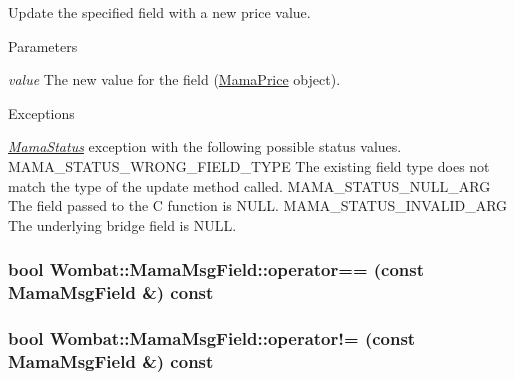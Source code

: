 Update the specified field with a new price value. 
\begin{DoxyParams}{Parameters}
\item[{\em value}]The new value for the field (\hyperlink{classWombat_1_1MamaPrice}{MamaPrice} object).\end{DoxyParams}

\begin{DoxyExceptions}{Exceptions}
\item[{\em \hyperlink{classWombat_1_1MamaStatus}{MamaStatus}}]exception with the following possible status values. MAMA\_\-STATUS\_\-WRONG\_\-FIELD\_\-TYPE The existing field type does not match the type of the update method called. MAMA\_\-STATUS\_\-NULL\_\-ARG The field passed to the C function is NULL. MAMA\_\-STATUS\_\-INVALID\_\-ARG The underlying bridge field is NULL. \end{DoxyExceptions}
\hypertarget{classWombat_1_1MamaMsgField_a288819019e6d1fe09d42c5087e37ca00}{
\subsubsection[{operator==}]{\setlength{\rightskip}{0pt plus 5cm}bool Wombat::MamaMsgField::operator== (const {\bf MamaMsgField} \&) const}}
\label{classWombat_1_1MamaMsgField_a288819019e6d1fe09d42c5087e37ca00}
\hypertarget{classWombat_1_1MamaMsgField_a1945f91ef878e9392b836cbcbe192e14}{
\subsubsection[{operator!=}]{\setlength{\rightskip}{0pt plus 5cm}bool Wombat::MamaMsgField::operator!= (const {\bf MamaMsgField} \&) const}}
\label{classWombat_1_1MamaMsgField_a1945f91ef878e9392b836cbcbe192e14}
